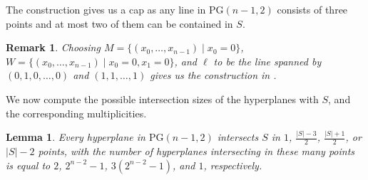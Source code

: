 \documentclass[a4paper,11pt]{amsproc}
\theoremstyle{plain}
\newtheorem{Lemma} [Theorem] {Lemma}
\newtheorem{Remark} [Theorem] {Remark}
\theoremstyle{definition}
\newcommand{\<}{\langle}
\renewcommand{\>}{\rangle} %
\begin{document}
The construction gives us a cap as any line in $\mathrm{PG}(n - 1, 2)$ consists of three points and at most two of them can be contained in $S$. 

\begin{Remark}
Choosing $M = \{(x_0, \dots, x_{n - 1}) \mid x_0 = 0 \}$, $W = \{(x_0, \dots, x_{n-1}) \mid x_0=0, x_1=0 \}$, and $\ell$ to be the line spanned by $(0, 1, 0, \dots, 0)$ and $(1, 1, \dots, 1)$ gives us the construction in \cite{davy2, gabi}.
\end{Remark}



We now compute the possible intersection sizes of the hyperplanes with $S$, and the corresponding multiplicities. 

\begin{Lemma}
    Every hyperplane in $\mathrm{PG}(n - 1, 2)$ intersects $S$ in $1$, $\frac{|S|-3}{2}$, $\frac{|S|+1}{2}$, or $|S|-2$ points, with the number of hyperplanes intersecting in these many points is equal to $2$, $2^{n - 2} - 1$, $3 (2^{n - 2} - 1)$, and $1$, respectively.
\end{Lemma}
\end{document}
